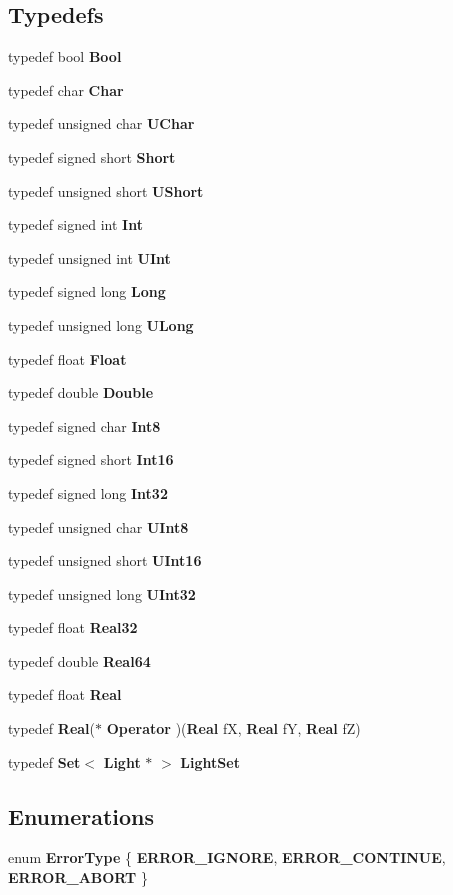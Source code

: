 \subsection*{Typedefs}
\begin{CompactItemize}
\item 
typedef bool {\bf Bool}
\item 
typedef char {\bf Char}
\item 
typedef unsigned char {\bf UChar}
\item 
typedef signed short {\bf Short}
\item 
typedef unsigned short {\bf UShort}
\item 
typedef signed int {\bf Int}
\item 
typedef unsigned int {\bf UInt}
\item 
typedef signed long {\bf Long}
\item 
typedef unsigned long {\bf ULong}
\item 
typedef float {\bf Float}
\item 
typedef double {\bf Double}
\item 
typedef signed char {\bf Int8}
\item 
typedef signed short {\bf Int16}
\item 
typedef signed long {\bf Int32}
\item 
typedef unsigned char {\bf UInt8}
\item 
typedef unsigned short {\bf UInt16}
\item 
typedef unsigned long {\bf UInt32}
\item 
typedef float {\bf Real32}
\item 
typedef double {\bf Real64}
\item 
typedef float {\bf Real}
\item 
typedef {\bf Real}($\ast$ {\bf Operator} )({\bf Real} f\-X, {\bf Real} f\-Y, {\bf Real} f\-Z)
\item 
typedef {\bf Set}$<$ {\bf Light} $\ast$ $>$ {\bf Light\-Set}
\end{CompactItemize}
\subsection*{Enumerations}
\begin{CompactItemize}
\item 
enum {\bf Error\-Type} \{ {\bf ERROR\_\-IGNORE}, 
{\bf ERROR\_\-CONTINUE}, 
{\bf ERROR\_\-ABORT}
 \}
\end{CompactItemize}
